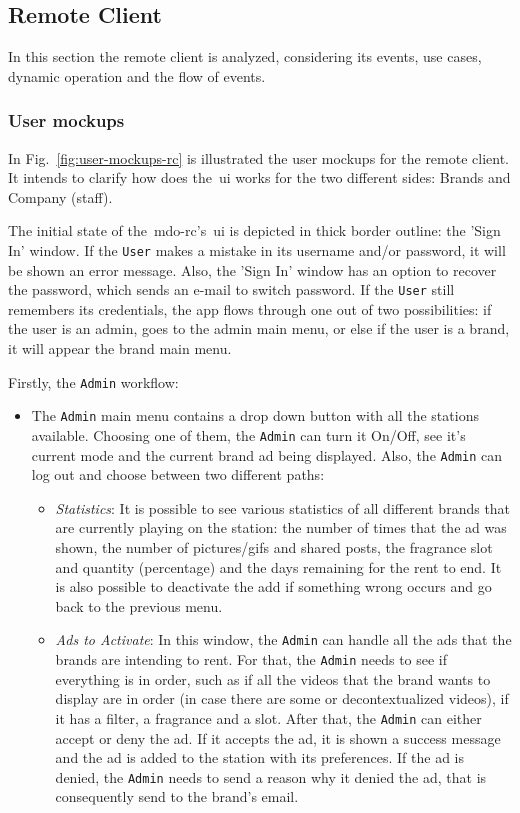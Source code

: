 %
\subsection{Remote Client}
\label{sec:remote-cli-decomp}
%
In this section the remote client is analyzed, considering its events, use cases, dynamic operation and the flow of events.

\subsubsection{User mockups}
\label{sec:user-mockups-1}
%
In Fig.~\ref{fig:user-mockups-rc} is illustrated the user mockups for the remote client. 
It intends to clarify how does the~\gls{ui} works for the two different sides: Brands and Company (staff).

The initial state of the~\gls{mdo-rc}'s~\gls{ui} is depicted in thick border outline: the 'Sign In' window. 
If the \texttt{User} makes a mistake in its username and/or password, it will be shown an error message. 
Also, the 'Sign In' window has an option to recover the password, which sends an e-mail to switch password.
If the \texttt{User} still remembers its credentials, the app flows through one out of two possibilities: if the user is an admin, goes to the admin main menu, or else if the user is a brand, it will appear the brand main menu.

Firstly, the \texttt{Admin} workflow:
%
\begin{itemize}
\item The \texttt{Admin} main menu contains a drop down button with all the stations available. Choosing one of them, the \texttt{Admin} can turn it On/Off, see it's current mode and the current brand ad being displayed. Also, the \texttt{Admin} can log out and choose between two different paths:
%
\begin{itemize}
\item \emph{Statistics}: It is possible to see various statistics of all different brands that are currently playing on the station: the number of times that the ad was shown, the number of pictures/\gls{gif}s and shared posts, the fragrance slot and quantity (percentage) and the days remaining for the rent to end.
It is also possible to deactivate the add if something wrong occurs and go back to the previous menu.
\item \emph{Ads to Activate}: In this window, the \texttt{Admin} can handle all the ads that the brands are intending to rent.
For that, the \texttt{Admin} needs to see if everything is in order, such as if all the videos that the brand wants to display are in order (in case there are some  or decontextualized videos), if it has a filter, a fragrance and a slot.
After that, the \texttt{Admin} can either accept or deny the ad.
If it accepts the ad, it is shown a success message and the ad is added to the station with its preferences.
If the ad is denied, the \texttt{Admin} needs to send a reason why it denied the ad, that is consequently send to the brand's email.
\end{itemize}
%
\end{itemize}

